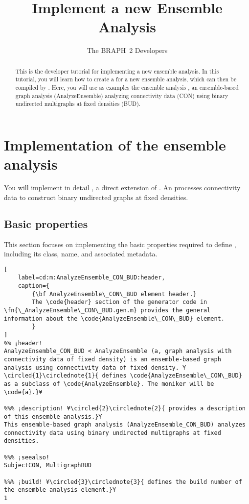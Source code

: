 \documentclass{tufte-handout}
\title{Implement a new Ensemble Analysis}
\author[The BRAPH~2 Developers]{The BRAPH~2 Developers}
\begin{document}
\maketitle

\begin{abstract}
\noindent
This is the developer tutorial for implementing a new ensemble analysis. 
In this tutorial, you will learn how to create a  for a new ensemble analysis, which can then be compiled by .
Here, you will use as examples the ensemble analysis , an ensemble-based graph analysis (AnalyzeEnsemble) analyzing connectivity data (CON) using binary undirected multigraphs at fixed densities (BUD).
\end{abstract}

\tableofcontents

\clearpage

\section{Implementation of the ensemble analysis}

You will implement in detail , a direct extension of .
An  processes connectivity data to construct binary undirected graphs at fixed densities.

\subsection{Basic properties}
This section focuses on implementing the basic properties required to define , including its class, name, and associated metadata.

\begin{lstlisting}[
	label=cd:m:AnalyzeEnsemble_CON_BUD:header,
	caption={
		{\bf AnalyzeEnsemble\_CON\_BUD element header.}
		The \code{header} section of the generator code in \fn{\_AnalyzeEnsemble\_CON\_BUD.gen.m} provides the general information about the \code{AnalyzeEnsemble\_CON\_BUD} element.
		}
]
%% ¡header!
AnalyzeEnsemble_CON_BUD < AnalyzeEnsemble (a, graph analysis with connectivity data of fixed density) is an ensemble-based graph analysis using connectivity data of fixed density. ¥\circled{1}\circlednote{1}{ defines \code{AnalyzeEnsemble\_CON\_BUD} as a subclass of \code{AnalyzeEnsemble}. The moniker will be \code{a}.}¥

%%% ¡description! ¥\circled{2}\circlednote{2}{ provides a description of this ensemble analysis.}¥
This ensemble-based graph analysis (AnalyzeEnsemble_CON_BUD) analyzes 
connectivity data using binary undirected multigraphs at fixed densities.

%%% ¡seealso!
SubjectCON, MultigraphBUD

%%% ¡build! ¥\circled{3}\circlednote{3}{ defines the build number of the ensemble analysis element.}¥
1
\end{lstlisting}
\end{document}

